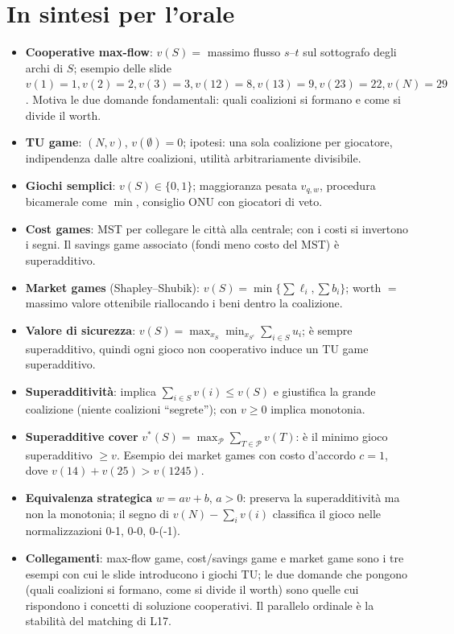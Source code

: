 \documentclass[12pt,a4paper,twoside]{book}
\theoremstyle{plain}
\theoremstyle{definition}
\begin{document}
\section*{In sintesi per l'orale}
\begin{itemize}
  \item \textbf{Cooperative max-flow}: $v(S)=$ massimo flusso $s$--$t$ sul sottografo degli archi di $S$; esempio delle slide $v(1)=1,v(2)=2,v(3)=3,v(12)=8,v(13)=9,v(23)=22,v(N)=29$. Motiva le due domande fondamentali: quali coalizioni si formano e come si divide il worth.
  \item \textbf{TU game}: $(N,v)$, $v(\emptyset)=0$; ipotesi: una sola coalizione per giocatore, indipendenza dalle altre coalizioni, utilità arbitrariamente divisibile.
  \item \textbf{Giochi semplici}: $v(S)\in\{0,1\}$; maggioranza pesata $v_{q,w}$, procedura bicamerale come $\min$, consiglio ONU con giocatori di veto.
  \item \textbf{Cost games}: MST per collegare le città alla centrale; con i costi si invertono i segni. Il savings game associato (fondi meno costo del MST) è superadditivo.
  \item \textbf{Market games} (Shapley--Shubik): $v(S)=\min\{\sum\ell_i,\sum b_i\}$; worth $=$ massimo valore ottenibile riallocando i beni dentro la coalizione.
  \item \textbf{Valore di sicurezza}: $v(S)=\max_{x_S}\min_{x_{S^c}}\sum_{i\in S}u_i$; è sempre superadditivo, quindi ogni gioco non cooperativo induce un TU game superadditivo.
  \item \textbf{Superadditività}: implica $\sum_{i\in S}v(i)\le v(S)$ e giustifica la grande coalizione (niente coalizioni ``segrete''); con $v\ge0$ implica monotonia.
  \item \textbf{Superadditive cover} $v^*(S)=\max_{\mathcal P}\sum_{T\in\mathcal P}v(T)$: è il minimo gioco superadditivo $\ge v$. Esempio dei market games con costo d'accordo $c=1$, dove $v(14)+v(25)>v(1245)$.
  \item \textbf{Equivalenza strategica} $w=av+b$, $a>0$: preserva la superadditività ma non la monotonia; il segno di $v(N)-\sum_i v(i)$ classifica il gioco nelle normalizzazioni 0-1, 0-0, 0-(-1).
  \item \textbf{Collegamenti}: max-flow game, cost/savings game e market game sono i tre esempi con cui le slide introducono i giochi TU; le due domande che pongono (quali coalizioni si formano, come si divide il worth) sono quelle cui rispondono i concetti di soluzione cooperativi. Il parallelo ordinale è la stabilità del matching di L17.
\end{itemize}
\end{document}
